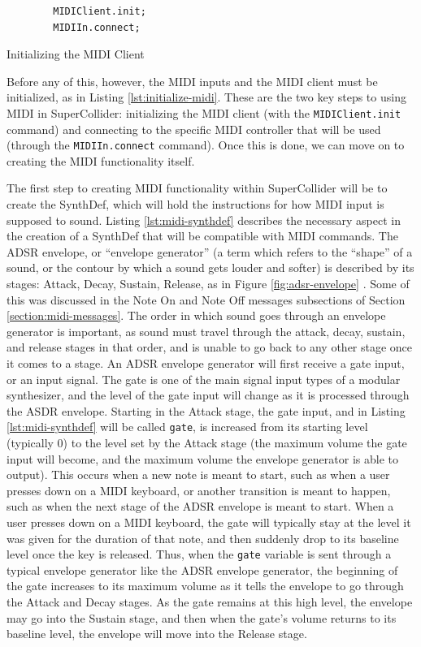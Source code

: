 \begin{listing}
	\begin{lstlisting}
		MIDIClient.init;
		MIDIIn.connect;
	\end{lstlisting}
	\caption{Initializing the MIDI Client}
	\label{lst:initialize-midi}
\end{listing}

Before any of this, however, the MIDI inputs and the MIDI client must be initialized, as in Listing \ref{lst:initialize-midi}. These are the two key steps to using MIDI in SuperCollider: initializing the MIDI client (with the \texttt{MIDIClient.init} command) and connecting to the specific MIDI controller that will be used (through the \texttt{MIDIIn.connect} command). Once this is done, we can move on to creating the MIDI functionality itself.

The first step to creating MIDI functionality within SuperCollider will be to create the SynthDef, which will hold the instructions for how MIDI input is supposed to sound. Listing \ref{lst:midi-synthdef} describes the necessary aspect in the creation of a SynthDef that will  be compatible with MIDI commands. The ADSR envelope, or ``envelope generator'' (a term which refers to the ``shape'' of a sound, or the contour by which a sound gets louder and softer) is described by its stages: Attack, Decay, Sustain, Release, as in Figure \ref{fig:adsr-envelope} \cite{Puckette_2007}. Some of this was discussed in the Note On and Note Off messages subsections of Section \ref{section:midi-messages}. The order in which sound goes through an envelope generator is important, as sound must travel through the attack, decay, sustain, and release stages in that order, and is unable to go back to any other stage once it comes to a stage. An ADSR envelope generator will first receive a gate input, or an input signal. The gate is one of the main signal input types of a modular synthesizer, and the level of the gate input will change as it is processed through the ASDR envelope. Starting in the Attack stage, the gate input, and in Listing \ref{lst:midi-synthdef} will be called \texttt{gate}, is increased from its starting level (typically 0) to the level set by the Attack stage (the maximum volume the gate input will become, and the maximum volume the envelope generator is able to output). This occurs when a new note is meant to start, such as when a user presses down on a MIDI keyboard, or another transition is meant to happen, such as when the next stage of the ADSR envelope is meant to start. When a user presses down on a MIDI keyboard, the gate will typically stay at the level it was given for the duration of that note, and then suddenly drop to its baseline level once the key is released. Thus, when the \texttt{gate} variable is sent through a typical envelope generator like the ADSR envelope generator, the beginning of the gate increases to its maximum volume as it tells the envelope to go through the Attack and Decay stages. As the gate remains at this high level, the envelope may go into the Sustain stage, and then when the gate's volume returns to its baseline level, the envelope will move into the Release stage. 


